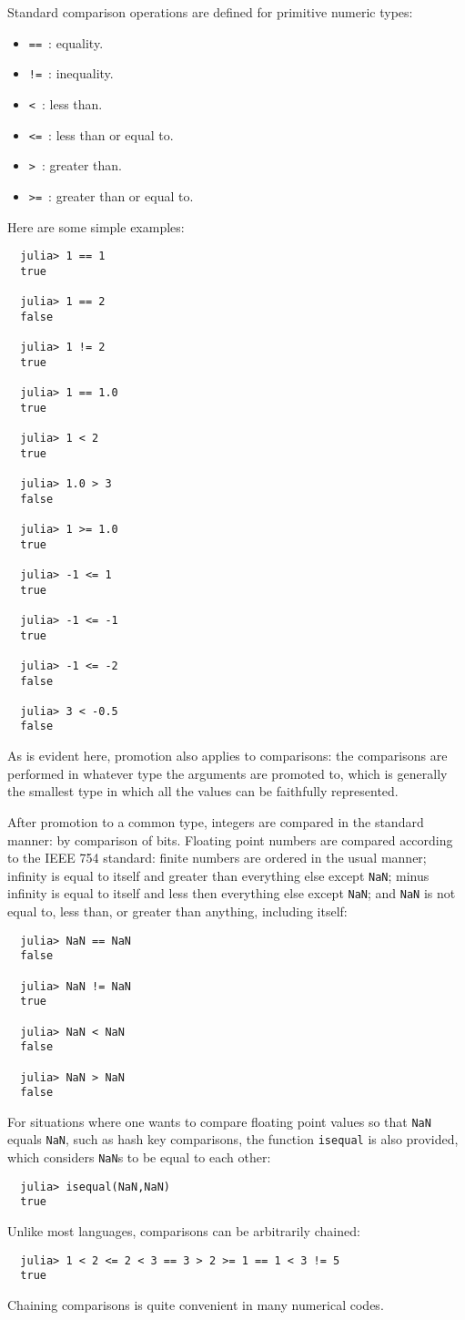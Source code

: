 \documentclass{article}
\begin{document}
Standard comparison operations are defined for primitive numeric types:
\begin{itemize}
  \item \verb|==|~: equality.
  \item \verb|!=|~: inequality.
  \item \verb|<|~: less than.
  \item \verb|<=|~: less than or equal to.
  \item \verb|>|~: greater than.
  \item \verb|>=|~: greater than or equal to.
\end{itemize}
Here are some simple examples:
\begin{verbatim}
  julia> 1 == 1
  true

  julia> 1 == 2
  false

  julia> 1 != 2
  true
  
  julia> 1 == 1.0
  true

  julia> 1 < 2
  true

  julia> 1.0 > 3
  false

  julia> 1 >= 1.0
  true

  julia> -1 <= 1
  true

  julia> -1 <= -1
  true

  julia> -1 <= -2
  false

  julia> 3 < -0.5
  false
\end{verbatim}
As is evident here, promotion also applies to comparisons:
the comparisons are performed in whatever type the arguments are promoted to, which is generally the smallest type in which all the values can be faithfully represented.

After promotion to a common type, integers are compared in the standard manner:
by comparison of bits.
Floating point numbers are compared according to the IEEE 754 standard:
finite numbers are ordered in the usual manner;
infinity is equal to itself and greater than everything else except \verb|NaN|;
minus infinity is equal to itself and less then everything else except \verb|NaN|;
and \verb|NaN| is not equal to, less than, or greater than anything, including itself:
\begin{verbatim}
  julia> NaN == NaN
  false

  julia> NaN != NaN
  true

  julia> NaN < NaN
  false

  julia> NaN > NaN
  false
\end{verbatim}
For situations where one wants to compare floating point values so that \verb|NaN| equals \verb|NaN|, such as hash key comparisons, the function \verb|isequal| is also provided, which considers \verb|NaN|s to be equal to each other:
\begin{verbatim}
  julia> isequal(NaN,NaN)
  true
\end{verbatim}
Unlike most languages, comparisons can be arbitrarily chained:
\begin{verbatim}
  julia> 1 < 2 <= 2 < 3 == 3 > 2 >= 1 == 1 < 3 != 5
  true
\end{verbatim}
Chaining comparisons is quite convenient in many numerical codes.
\end{document}
